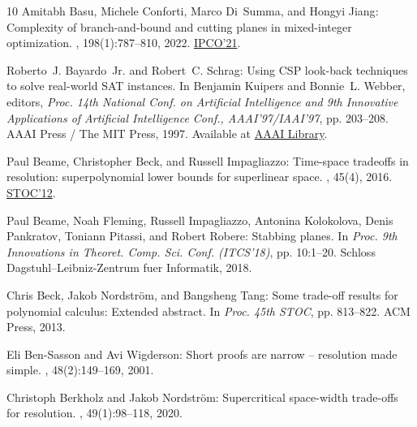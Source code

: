 \documentclass[11pt]{article}
\begin{document}
\begin{thebibliography}{10}
{\sc Amitabh Basu, Michele Conforti, Marco Di~Summa, and Hongyi Jiang}:
  Complexity of branch-and-bound and cutting planes in mixed-integer
  optimization.
, 198(1):787--810, 2022.
\newblock \prelim
  \href{https://doi.org/10.1007/978-3-030-73879-2\_27}{IPCO'21}.
\newblock [\epfmtdoi{10.1007/s10107-022-01789-5}]

{\sc Roberto~J. Bayardo~Jr. and Robert~C. Schrag}: Using {CSP} look-back
  techniques to solve real-world {SAT} instances.
\newblock In {\sc Benjamin Kuipers and Bonnie~L. Webber}, editors, {\em Proc.
  14th National Conf. on Artificial Intelligence and 9th Innovative
  Applications of Artificial Intelligence Conf., {AAAI}'97/{IAAI}'97}, pp.
  203--208. {AAAI} Press / The {MIT} Press, 1997.
\newblock Available at
  \href{http://www.aaai.org/Library/AAAI/1997/aaai97-032.php}{AAAI Library}.

{\sc Paul Beame, Christopher Beck, and Russell Impagliazzo}: Time-space
  tradeoffs in resolution: superpolynomial lower bounds for superlinear space.
, 45(4), 2016.
\newblock \prelim \href{https://doi.org/10.1145/2213977.2213999}{STOC'12}.
\newblock [\epfmtdoi{10.1137/130914085}]

{\sc Paul Beame, Noah Fleming, Russell Impagliazzo, Antonina Kolokolova, Denis
  Pankratov, Toniann Pitassi, and Robert Robere}: Stabbing planes.
\newblock In {\em Proc. 9th Innovations in Theoret. Comp. Sci. Conf.
  (ITCS'18)}, pp. 10:1--20. Schloss Dagstuhl--Leibniz-Zentrum fuer Informatik,
  2018.

{\sc Chris Beck, Jakob Nordstr{\"{o}}m, and Bangsheng Tang}: Some trade-off
  results for polynomial calculus: {E}xtended abstract.
\newblock In {\em Proc. 45th STOC}, pp. 813--822. ACM Press, 2013.
\newblock [\epfmtdoi{10.1145/2488608.2488711}]

{\sc Eli Ben{-}Sasson and Avi Wigderson}: Short proofs are narrow -- resolution
  made simple.
, 48(2):149--169, 2001.
\newblock [\epfmtdoi{10.1145/375827.375835}]

{\sc Christoph Berkholz and Jakob Nordstr{\"{o}}m}: Supercritical space-width
  trade-offs for resolution.
, 49(1):98--118, 2020.
\newblock [\epfmtdoi{10.1137/16M1109072}]


\end{thebibliography}
\end{document}
